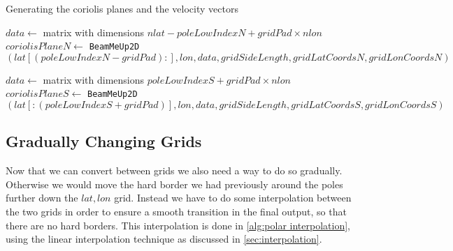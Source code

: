\begin{algorithm}[htb]
    \caption{Generating the coriolis planes and the velocity vectors}
    \label{alg:polar grid coriolis}
    $data \leftarrow $ matrix with dimensions $nlat - poleLowIndexN + gridPad \times nlon$ \;
    $coriolisPlaneN \leftarrow $ \texttt{BeamMeUp2D}$(lat[(poleLowIndexN - gridPad):], lon, data, gridSideLength, gridLatCoordsN, gridLonCoordsN)$ \;

    $data \leftarrow $ matrix with dimensions $poleLowIndexS + gridPad \times nlon$ \;
    $coriolisPlaneS \leftarrow $ \texttt{BeamMeUp2D}$(lat[:(poleLowIndexS + gridPad)], lon, data, gridSideLength, gridLatCoordsS, gridLonCoordsS)$ \;
\end{algorithm}

\subsection{Gradually Changing Grids}
Now that we can convert between grids we also need a way to do so gradually. Otherwise we would move the hard border we had previously around the poles further down the $lat, lon$ grid. Instead 
we have to do some interpolation between the two grids in order to ensure a smooth transition in the final output, so that there are no hard borders. This interpolation is done in 
\autoref{alg:polar interpolation}, using the linear interpolation technique as discussed in \autoref{sec:interpolation}.

